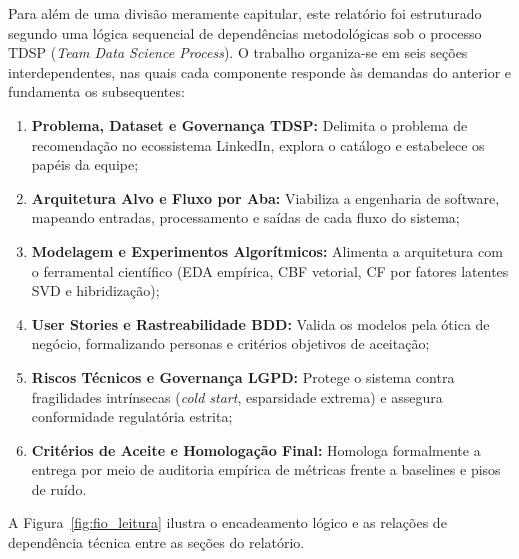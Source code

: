 Para além de uma divisão meramente capitular, este relatório foi estruturado segundo uma lógica sequencial de dependências metodológicas sob o processo TDSP (\textit{Team Data Science Process}). O trabalho organiza-se em seis seções interdependentes, nas quais cada componente responde às demandas do anterior e fundamenta os subsequentes:

\begin{enumerate}[label=\textbf{Seção \arabic*:}, leftmargin=2.2em, itemsep=2pt]
    \item \textbf{Problema, Dataset e Governança TDSP:} Delimita o problema de recomendação no ecossistema LinkedIn, explora o catálogo e estabelece os papéis da equipe;
    \item \textbf{Arquitetura Alvo e Fluxo por Aba:} Viabiliza a engenharia de software, mapeando entradas, processamento e saídas de cada fluxo do sistema;
    \item \textbf{Modelagem e Experimentos Algorítmicos:} Alimenta a arquitetura com o ferramental científico (EDA empírica, CBF vetorial, CF por fatores latentes SVD e hibridização);
    \item \textbf{User Stories e Rastreabilidade BDD:} Valida os modelos pela ótica de negócio, formalizando personas e critérios objetivos de aceitação;
    \item \textbf{Riscos Técnicos e Governança LGPD:} Protege o sistema contra fragilidades intrínsecas (\textit{cold start}, esparsidade extrema) e assegura conformidade regulatória estrita;
    \item \textbf{Critérios de Aceite e Homologação Final:} Homologa formalmente a entrega por meio de auditoria empírica de métricas frente a baselines e pisos de ruído.
\end{enumerate}

A Figura~\ref{fig:fio_leitura} ilustra o encadeamento lógico e as relações de dependência técnica entre as seções do relatório.


